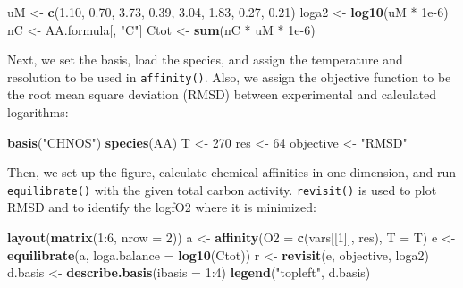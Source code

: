 \documentclass[]{tufte-book}
\newenvironment{Shaded}{}{}
\newcommand{\KeywordTok}[1]{\textcolor[rgb]{0.00,0.44,0.13}{\textbf{#1}}}
\newcommand{\DataTypeTok}[1]{\textcolor[rgb]{0.56,0.13,0.00}{#1}}
\newcommand{\DecValTok}[1]{\textcolor[rgb]{0.25,0.63,0.44}{#1}}
\newcommand{\FloatTok}[1]{\textcolor[rgb]{0.25,0.63,0.44}{#1}}
\newcommand{\StringTok}[1]{\textcolor[rgb]{0.25,0.44,0.63}{#1}}
\newcommand{\OperatorTok}[1]{\textcolor[rgb]{0.40,0.40,0.40}{#1}}
\newcommand{\NormalTok}[1]{#1}
\begin{document}
\begin{Shaded}
\begin{Highlighting}[]
\NormalTok{uM <-}\StringTok{ }\KeywordTok{c}\NormalTok{(}\FloatTok{1.10}\NormalTok{, }\FloatTok{0.70}\NormalTok{, }\FloatTok{3.73}\NormalTok{, }\FloatTok{0.39}\NormalTok{, }\FloatTok{3.04}\NormalTok{, }\FloatTok{1.83}\NormalTok{, }\FloatTok{0.27}\NormalTok{, }\FloatTok{0.21}\NormalTok{)}
\NormalTok{loga2 <-}\StringTok{ }\KeywordTok{log10}\NormalTok{(uM }\OperatorTok{*}\StringTok{ }\FloatTok{1e-6}\NormalTok{)}
\NormalTok{nC <-}\StringTok{ }\NormalTok{AA.formula[, }\StringTok{"C"}\NormalTok{]}
\NormalTok{Ctot <-}\StringTok{ }\KeywordTok{sum}\NormalTok{(nC }\OperatorTok{*}\StringTok{ }\NormalTok{uM }\OperatorTok{*}\StringTok{ }\FloatTok{1e-6}\NormalTok{)}
\end{Highlighting}
\end{Shaded}

Next, we set the basis, load the species, and assign the temperature and
resolution to be used in {\texttt{affinity()}}. Also, we assign the
objective function to be the root mean square deviation (RMSD) between
experimental and calculated logarithms:

\begin{Shaded}
\begin{Highlighting}[]
\KeywordTok{basis}\NormalTok{(}\StringTok{"CHNOS"}\NormalTok{)}
\KeywordTok{species}\NormalTok{(AA)}
\NormalTok{T <-}\StringTok{ }\DecValTok{270}
\NormalTok{res <-}\StringTok{ }\DecValTok{64}
\NormalTok{objective <-}\StringTok{ "RMSD"}
\end{Highlighting}
\end{Shaded}

Then, we set up the figure, calculate chemical affinities in one
dimension, and run {\texttt{equilibrate()}} with the given total carbon
activity. {\texttt{revisit()}} is used to plot RMSD and to identify the
logfO2 where it is minimized:

\begin{Shaded}
\begin{Highlighting}[]
\KeywordTok{layout}\NormalTok{(}\KeywordTok{matrix}\NormalTok{(}\DecValTok{1}\OperatorTok{:}\DecValTok{6}\NormalTok{, }\DataTypeTok{nrow =} \DecValTok{2}\NormalTok{))}
\NormalTok{a <-}\StringTok{ }\KeywordTok{affinity}\NormalTok{(}\DataTypeTok{O2 =} \KeywordTok{c}\NormalTok{(vars[[}\DecValTok{1}\NormalTok{]], res), }\DataTypeTok{T =}\NormalTok{ T)}
\NormalTok{e <-}\StringTok{ }\KeywordTok{equilibrate}\NormalTok{(a, }\DataTypeTok{loga.balance =} \KeywordTok{log10}\NormalTok{(Ctot))}
\NormalTok{r <-}\StringTok{ }\KeywordTok{revisit}\NormalTok{(e, objective, loga2)}
\NormalTok{d.basis <-}\StringTok{ }\KeywordTok{describe.basis}\NormalTok{(}\DataTypeTok{ibasis =} \DecValTok{1}\OperatorTok{:}\DecValTok{4}\NormalTok{)}
\KeywordTok{legend}\NormalTok{(}\StringTok{"topleft"}\NormalTok{, d.basis)}
\end{Highlighting}
\end{Shaded}
\end{document}
